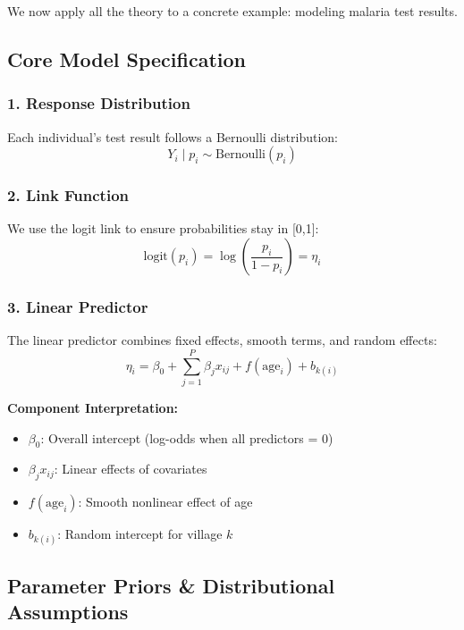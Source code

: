 \documentclass[12pt]{article}
\begin{document}
We now apply all the theory to a concrete example: modeling malaria test results.

\subsection{Core Model Specification}

\subsubsection{1. Response Distribution}
Each individual's test result follows a Bernoulli distribution:
\begin{equation*}
    Y_i \mid p_i \sim \text{Bernoulli}(p_i)
\end{equation*}

\subsubsection{2. Link Function}
We use the logit link to ensure probabilities stay in [0,1]:
\begin{equation*}
    \text{logit}(p_i) = \log\left(\frac{p_i}{1-p_i}\right) = \eta_i
\end{equation*}

\subsubsection{3. Linear Predictor}
The linear predictor combines fixed effects, smooth terms, and random effects:
\begin{equation*}
    \eta_i = \beta_0 + \sum_{j=1}^{P} \beta_j x_{ij} + f(\text{age}_i) + b_{k(i)}
\end{equation*}

\textbf{Component Interpretation:}
\begin{itemize}
    \item $\beta_0$: Overall intercept (log-odds when all predictors = 0)
    \item $\beta_j x_{ij}$: Linear effects of covariates
    \item $f(\text{age}_i)$: Smooth nonlinear effect of age
    \item $b_{k(i)}$: Random intercept for village $k$
\end{itemize}

\subsection{Parameter Priors \& Distributional Assumptions}
\end{document}
